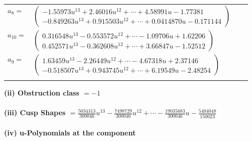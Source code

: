 \documentclass[1p]{elsarticle_modified}
\theoremstyle{definition}
\begin{document}
\begin{tabular}{m{7pt} m{180pt} m{7pt} m{180pt} }
\flushright $a_{8}=$&$\begin{pmatrix}-1.55973 u^{13}+2.46016 u^{12}+\cdots+4.58991 u-1.77381\\-0.849263 u^{13}+0.915503 u^{12}+\cdots+0.0414870 u-0.171144\end{pmatrix}$ \\
\flushright $a_{10}=$&$\begin{pmatrix}0.316548 u^{13}-0.553572 u^{12}+\cdots-1.09706 u+1.62206\\0.452571 u^{13}-0.362608 u^{12}+\cdots+3.66847 u-1.52512\end{pmatrix}$ \\
\flushright $a_{9}=$&$\begin{pmatrix}1.63459 u^{13}-2.26449 u^{12}+\cdots-4.67318 u+2.37146\\-0.518507 u^{13}+0.943745 u^{12}+\cdots+6.19549 u-2.48254\end{pmatrix}$\\&\end{tabular}
\flushleft \textbf{(ii) Obstruction class $= -1$}\\~\\
\flushleft \textbf{(iii) Cusp Shapes $= \frac{5034313}{300046} u^{13}-\frac{7498729}{300046} u^{12}+\cdots-\frac{19035683}{300046} u-\frac{5404048}{150023}$}\\~\\
\newpage\renewcommand{\arraystretch}{1}
\flushleft \textbf{(iv) u-Polynomials at the component}\newline \\
\end{document}
